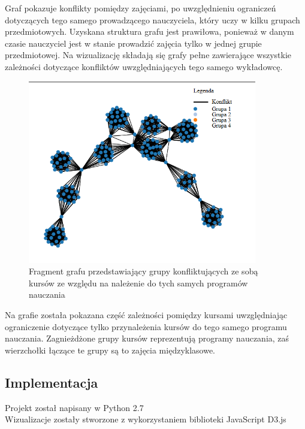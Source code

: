 \par Graf pokazuje konflikty pomiędzy zajęciami, po uwzględnieniu ograniczeń dotyczących tego samego prowadzącego nauczyciela, który uczy w kilku grupach przedmiotowych. Uzyskana struktura grafu jest prawiłowa, ponieważ w danym czasie nauczyciel jest w stanie prowadzić zajęcia tylko w jednej grupie przedmiotowej. Na wizualizację składają się grafy pełne zawierające wszystkie zależności dotyczące konfliktów uwzględniających tego samego wykładowcę.
\begin{figure}[H]
  \centering
  
   \includegraphics[width=10cm]{fragmentszkola.PNG}
    \caption{Fragment grafu przedstawiający grupy konfliktujących ze sobą kursów ze względu na należenie do tych samych programów nauczania}
\end{figure}
\par Na grafie została pokazana część zależności pomiędzy kursami uwzględniając ograniczenie dotyczące tylko przynależenia kursów do tego samego programu nauczania. Zagnieżdżone grupy kursów reprezentują programy nauczania, zaś wierzchołki łączące te grupy są to zajęcia międzyklasowe.

\subsection{Implementacja}
Projekt został napisany w Python 2.7 \\
Wizualizacje zostały stworzone z wykorzystaniem biblioteki JavaScript D3.js \cite{wiz}
